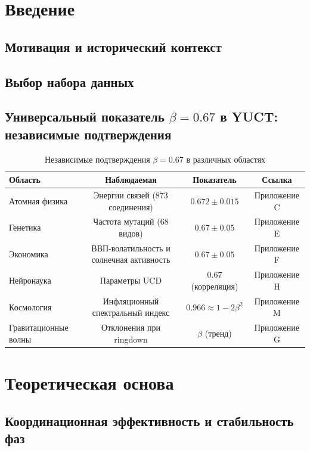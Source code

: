 \documentclass[12pt,a4paper]{article}
\theoremstyle{remark}
\begin{document}
	\section{Введение}
	\subsection{Мотивация и исторический контекст}
	\subsection{Выбор набора данных}
	\subsection{Универсальный показатель \(\beta = 0.67\) в YUCT: независимые подтверждения}
	
	\begin{table}[htbp]
		\scriptsize
		\centering
		\caption{Независимые подтверждения \(\beta = 0.67\) в различных областях}
		\label{tab:beta_confirmation}
		\begin{tabular}{@{}lccc@{}}
			\toprule
			\textbf{Область} & \textbf{Наблюдаемая} & \textbf{Показатель} & \textbf{Ссылка} \\
			\midrule
			Атомная физика & Энергии связей (873 соединения) & \(0.672\pm0.015\) & Приложение C \\
			Генетика & Частота мутаций (68 видов) & \(0.67\pm0.05\) & Приложение E \\
			Экономика & ВВП-волатильность и солнечная активность & \(0.67\pm0.05\) & Приложение F \\
			Нейронаука & Параметры UCD & \(0.67\) (корреляция) & Приложение H \\
			Космология & Инфляционный спектральный индекс & \(0.966 \approx 1-2\beta^2\) & Приложение M \\
			Гравитационные волны & Отклонения при ringdown & \(\beta\) (тренд) & Приложение G \\
			\bottomrule
		\end{tabular}
	\end{table}
	
	\section{Теоретическая основа}
	\subsection{Координационная эффективность и стабильность фаз}
\end{document}
